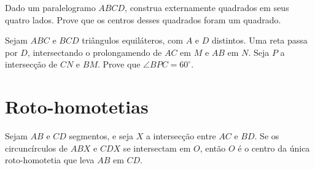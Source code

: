 \documentclass[10pt, a4paper]{article}
\begin{document}
	\begin{prob}
		Dado um paralelogramo $ABCD$, construa externamente quadrados em seus quatro lados. Prove que os centros desses quadrados foram um quadrado.
	\end{prob}

	\begin{prob}
		Sejam $ABC$ e $BCD$ triângulos equiláteros, com $A$ e $D$ distintos. Uma reta passa por $D$, intersectando o prolongamendo de $AC$ em $M$ e $AB$ em $N$. Seja $P$ a intersecção de $CN$ e $BM$. Prove que $\angle BPC = 60^\circ$.
	\end{prob}


	\section{Roto-homotetias}

	\begin{prob}
		Sejam $AB$ e $CD$ segmentos, e seja $X$ a intersecção entre $AC$ e $BD$. Se os circuncírculos de $ABX$ e $CDX$ se intersectam em $O$, então $O$ é o centro da única roto-homotetia que leva $AB$ em $CD$.
	\end{prob}

	


\end{document}
